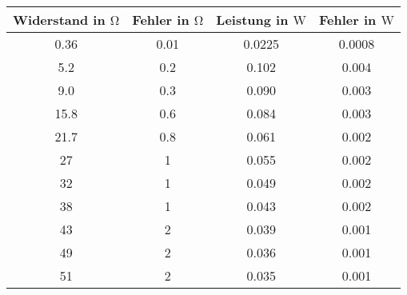 \begin{tabular}{c|c||c|c}
Widerstand in $\si{\ohm}$ & Fehler in $\si{\ohm}$ & Leistung in $\si{\watt}$ & Fehler in $\si{\watt}$ \\
\hline
  0.36  & 0.01  & 0.0225   & 0.0008  \\
  5.2  & 0.2  & 0.102   & 0.004  \\
  9.0  & 0.3  & 0.090   & 0.003  \\
 15.8  & 0.6  & 0.084   & 0.003  \\
 21.7  & 0.8  & 0.061   & 0.002  \\
 27  & 1  & 0.055   & 0.002  \\
 32  & 1  & 0.049   & 0.002  \\
 38  & 1  & 0.043   & 0.002  \\
 43  & 2  & 0.039   & 0.001  \\
 49  & 2  & 0.036   & 0.001  \\
 51  & 2  & 0.035   & 0.001  \\
\end{tabular}